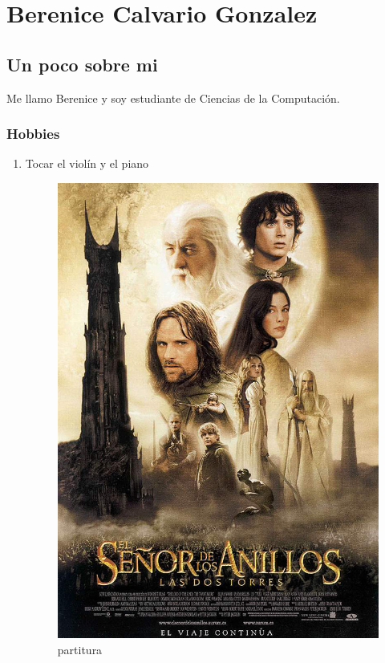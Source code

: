 
\chapter{Berenice Calvario Gonzalez}
\section{Un poco sobre mi}
Me llamo Berenice y soy estudiante de Ciencias de la Computación. 

\subsection{Hobbies}
\begin{enumerate}
\item Tocar el violín y el piano
  
  \begin{figure}[h]
    \centering
    \includegraphics[scale=0.02]{IMG/13.jpg}
    \caption{\small partitura} \label{fig:1}
  \end{figure}


\end{enumerate}
